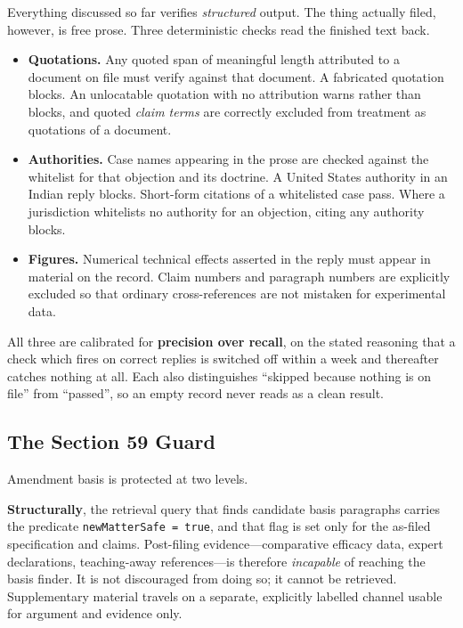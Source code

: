 \documentclass[conference]{IEEEtran}
\newcommand{\code}[1]{\texttt{\small #1}}
\begin{document}
Everything discussed so far verifies \emph{structured} output. The thing actually filed, however, is free prose. Three deterministic checks read the finished text back.

\begin{itemize}
\item \textbf{Quotations.} Any quoted span of meaningful length attributed to a document on file must verify against that document. A fabricated quotation blocks. An unlocatable quotation with no attribution warns rather than blocks, and quoted \emph{claim terms} are correctly excluded from treatment as quotations of a document.
\item \textbf{Authorities.} Case names appearing in the prose are checked against the whitelist for that objection and its doctrine. A United States authority in an Indian reply blocks. Short-form citations of a whitelisted case pass. Where a jurisdiction whitelists no authority for an objection, citing any authority blocks.
\item \textbf{Figures.} Numerical technical effects asserted in the reply must appear in material on the record. Claim numbers and paragraph numbers are explicitly excluded so that ordinary cross-references are not mistaken for experimental data.
\end{itemize}

All three are calibrated for \textbf{precision over recall}, on the stated reasoning that a check which fires on correct replies is switched off within a week and thereafter catches nothing at all. Each also distinguishes ``skipped because nothing is on file'' from ``passed'', so an empty record never reads as a clean result.

\subsection{The Section 59 Guard}

Amendment basis is protected at two levels.

\textbf{Structurally}, the retrieval query that finds candidate basis paragraphs carries the predicate \code{newMatterSafe = true}, and that flag is set only for the as-filed specification and claims. Post-filing evidence---comparative efficacy data, expert declarations, teaching-away references---is therefore \emph{incapable} of reaching the basis finder. It is not discouraged from doing so; it cannot be retrieved. Supplementary material travels on a separate, explicitly labelled channel usable for argument and evidence only.
\end{document}
